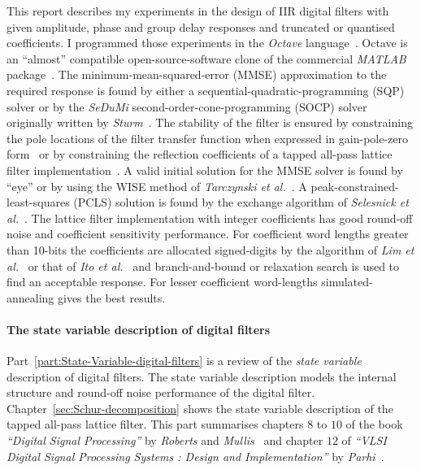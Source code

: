 \documentclass[a4paper,twoside,10pt,english]{report}
\begin{document}
This report describes my experiments in the design of IIR digital
filters with given amplitude, phase and group delay responses and
truncated or quantised coefficients. I programmed those experiments in the
\emph{Octave} language~\cite{Eaton_Octave}. Octave is an ``almost'' compatible
open-source-software clone of the commercial \emph{MATLAB}
package~\cite{Mathworks_MATLAB}.  The minimum-mean-squared-error (MMSE)
approximation to the required response is found by either a
sequential-quadratic-programming (SQP) solver or by the \emph{SeDuMi}
second-order-cone-programming (SOCP) solver originally written by
\emph{Sturm}~\cite{Sturm_SeDuMi_GitHub}. The stability of the filter is
ensured by constraining the pole locations of the filter transfer function
when expressed in gain-pole-zero
form~\cite{Deczky_MinPSynthesisIIRDigitalFilters,
  Richards_DeczkyRecursiveDecimator} or by constraining the reflection
coefficients of a tapped all-pass lattice filter
implementation~\cite{GrayMarkel_DigitalLatticeAndLadderFilterSynthesis,
  Parhi_VLSIDigitalSignalProcessingSystems}. A valid initial solution for the
MMSE solver is found by ``eye'' or by using the WISE method of
\emph{Tarczynski et
  al.}~\cite{TarczynskiCainHermanowiczRojewski_WISEMethodDesignIIRFilters}. A
peak-constrained-least-squares (PCLS) solution is found by the exchange
algorithm of \emph{Selesnick et
  al.}~\cite{SelesnickLangBurrus_ConstrainedLeastSquareMultiBandFIRFilters}.
The lattice filter implementation with integer coefficients has good round-off
noise and coefficient sensitivity performance. For coefficient word lengths
greater than 10-bits the coefficients are allocated signed-digits by the
algorithm of \emph{Lim et
  al.}~\cite{Lim_SignedPowerOfTwoAllocationDigitalFilters} or that of
\emph{Ito et al.}~\cite{Ito_PowersOfTwoAllocationFIR} and branch-and-bound or
relaxation search is used to find an acceptable response. For lesser
coefficient word-lengths simulated-annealing gives the best results.

\paragraph{The state variable description of digital filters}
Part~\ref{part:State-Variable-digital-filters} is a review of the \emph{state
  variable} description of digital filters. The state variable description
models the internal structure and round-off noise performance of the digital
filter. Chapter~\ref{sec:Schur-decomposition} shows the state variable
description of the tapped all-pass lattice filter. This part summarises
chapters $8$ to $10$ of the book \emph{``Digital Signal Processing''} by
\emph{Roberts} and \emph{Mullis}~\cite{RobertsMullis_DigitalSignalProcessing}
and chapter $12$ of \emph{``VLSI Digital Signal Processing Systems : Design
  and Implementation''} by
\emph{Parhi}~\cite{Parhi_VLSIDigitalSignalProcessingSystems}.
\end{document}
